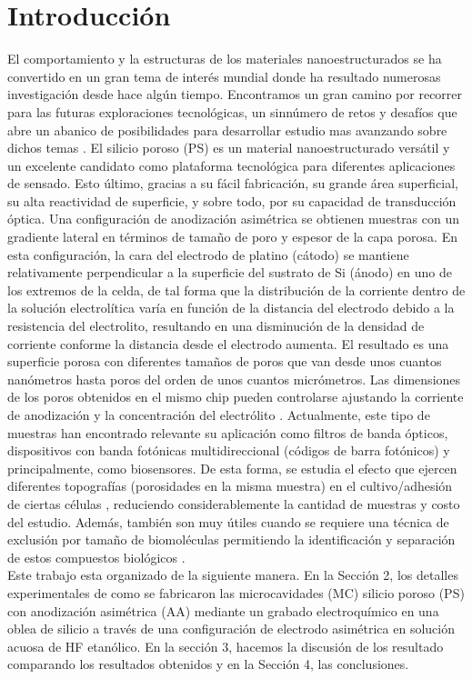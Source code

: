 \documentclass[a4paper,11pt,]{book}
\begin{document}
\section{Introducci\'on}
El comportamiento y la estructuras de los materiales nanoestructurados se ha convertido en un gran tema de interés mundial donde ha resultado numerosas  investigación desde hace algún tiempo. Encontramos un gran camino por recorrer  para las futuras exploraciones tecnológicas, un sinnúmero de retos y desafíos que abre un abanico de posibilidades para desarrollar estudio mas avanzando sobre dichos temas \cite{I1}. El silicio poroso (PS) es un material nanoestructurado versátil y un excelente candidato como plataforma tecnológica para diferentes aplicaciones de sensado\cite{I2}. Esto último, gracias a su fácil fabricación, su grande área superficial, su alta reactividad de superficie, y sobre todo, por su capacidad de transducción óptica.
Una configuración de anodización asimétrica se obtienen muestras con un gradiente lateral en términos de tamaño de poro y espesor de la capa porosa. En esta configuración, la cara del electrodo de platino (cátodo) se mantiene relativamente perpendicular a la superficie del sustrato de Si (ánodo) en uno de los extremos de la celda, de tal forma que la distribución de la corriente dentro de la solución electrolítica varía en función de la distancia del electrodo debido a la resistencia del electrolito, resultando en una disminución de la densidad de corriente conforme la distancia desde el electrodo aumenta. El resultado es una superficie porosa con diferentes tamaños de poros que van desde unos cuantos nanómetros hasta poros del orden de unos cuantos micrómetros. Las dimensiones de los poros obtenidos en el mismo chip pueden controlarse ajustando la corriente de anodización y la concentración del electrólito \cite{I3}. Actualmente, este tipo de muestras han encontrado relevante su aplicación como filtros de banda ópticos\cite{I3}, dispositivos con banda fotónicas multidireccional (códigos de barra fotónicos)\cite{I4} y principalmente, como biosensores. De esta forma, se estudia el efecto que ejercen diferentes topografías (porosidades en la misma muestra) en el cultivo/adhesión de ciertas células \cite{I5 ,I6}, reduciendo considerablemente la cantidad de muestras y costo del estudio. Además, también son muy útiles cuando se requiere una técnica de exclusión por tamaño de biomoléculas permitiendo la identificación y separación de estos compuestos biológicos \cite{I7}.\\ 
Este trabajo esta organizado de la siguiente manera. En la Sección 2, los detalles experimentales de como se  fabricaron las  microcavidades (MC) silicio poroso (PS) con anodización asimétrica (AA)    mediante un grabado electroquímico en una oblea de silicio a través de una configuración de electrodo asimétrica en solución acuosa de HF etanólico. En la sección 3, hacemos la discusión de los resultado comparando los resultados obtenidos y en la Sección 4, las conclusiones. 
\end{document}
